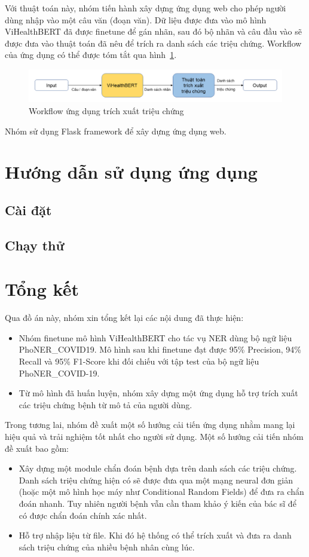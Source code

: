 \documentclass[12pt]{article}
\begin{document}
Với thuật toán này, nhóm tiến hành xây dựng ứng dụng web cho phép người dùng nhập vào một câu văn (đoạn văn). Dữ liệu được đưa vào mô hình ViHealthBERT đã được finetune để gán nhãn, sau đó bộ nhãn và câu đầu vào sẽ được đưa vào thuật toán đã nêu để trích ra danh sách các triệu chứng. Workflow của ứng dụng có thể được tóm tắt qua hình~\ref{fig:workflow}.
\begin{figure}
\centering
\includegraphics[scale=.6]{img/workflow.png}
\caption{Workflow ứng dụng trích xuất triệu chứng}
\label{fig:workflow}
\end{figure}
Nhóm sử dụng Flask framework để xây dựng ứng dụng web.

\section{Hướng dẫn sử dụng ứng dụng}
\subsection{Cài đặt}

\subsection{Chạy thử}

\section{Tổng kết}
Qua đồ án này, nhóm xin tổng kết lại các nội dung đã thực hiện:
\begin{itemize}
\item Nhóm finetune mô hình ViHealthBERT cho tác vụ NER dùng bộ ngữ liệu PhoNER\_COVID19. Mô hình sau khi finetune đạt được 95\% Precision, 94\% Recall và 95\% F1-Score khi đối chiếu với tập test của bộ ngữ liệu PhoNER\_COVID-19.
\item Từ mô hình đã huấn luyện, nhóm xây dựng một ứng dụng hỗ trợ trích xuất các triệu chứng bệnh từ mô tả của người dùng.
\end{itemize}
Trong tương lai, nhóm đề xuất một số hướng cải tiến ứng dụng nhằm mang lại hiệu quả và trải nghiệm tốt nhất cho người sử dụng. Một số hướng cải tiến nhóm đề xuất bao gồm:
\begin{itemize}
\item Xây dựng một module chẩn đoán bệnh dựa trên danh sách các triệu chứng. Danh sách triệu chứng hiện có sẽ được đưa qua một mạng neural đơn giản (hoặc một mô hình học máy như Conditional Random Fields) để đưa ra chẩn đoán nhanh. Tuy nhiên người bệnh vẫn cần tham khảo ý kiến của bác sĩ để có được chẩn đoán chính xác nhất.
\item Hỗ trợ nhập liệu từ file. Khi đó hệ thống có thể trích xuất và đưa ra danh sách triệu chứng của nhiều bệnh nhân cùng lúc.
\end{itemize}


{}
{}


\end{document}
